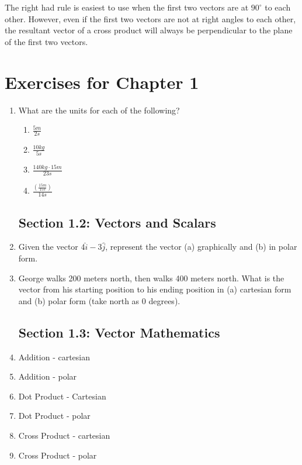 The right had rule is easiest to use when the first two vectors are at $90^\circ$ to each other.  However, even if the first two vectors are not at right angles to each other, the resultant vector of a cross product will always be perpendicular to the plane of the first two vectors.  


\newpage
\section{Exercises for Chapter 1}

\begin{multicols}{2}


	\begin{enumerate}


	\subsection*{Section 1.1: Dimensional Analysis}
		\item What are the units for each of the following?
			\begin{enumerate}
				\item $\frac{5 m}{2 s}$
				\item $\frac{10kg}{5s}$
				\item $\frac{140 kg \cdot 15 m}{23 s} $
				\item $\frac{(\frac{15m}{15s})}{14 s} $
				
			\end{enumerate}
	\subsection*{Section 1.2: Vectors and Scalars}
		\item Given the vector $4\hat{i} - 3 \hat{j}$, represent the vector (a) graphically and (b) in polar form.  
		\item George walks 200 meters north, then walks 400 meters north.  What is the vector from his starting position to his ending position in (a) cartesian form and (b) polar form (take north as 0 degrees).  
	\subsection*{Section 1.3: Vector Mathematics}
		\item Addition - cartesian
		\item Addition - polar
		\item Dot Product - Cartesian
		\item Dot Product - polar
		\item Cross Product - cartesian
		\item Cross Product - polar
		
		
	\end{enumerate}	
\end{multicols}	
	



